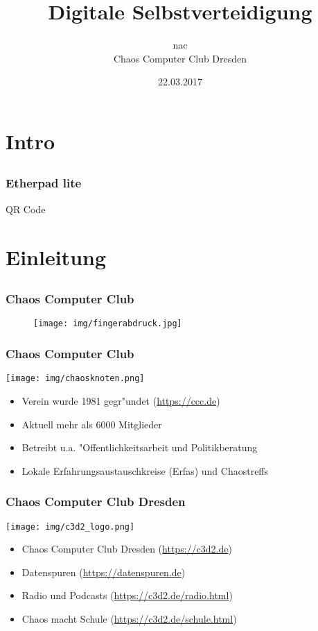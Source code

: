 \documentclass[12pt, table]{beamer}
\title{Digitale Selbstverteidigung}
\author{\small nac\\\large Chaos Computer Club Dresden}
\date{22.03.2017}
\begin{document}
\section{Intro}
\subsection{}

  \begin{frame}
    \frametitle{Etherpad lite}
    \begin{center}
      QR Code
    \end{center}
  \end{frame}

\section{Einleitung}
  \subsection{}

  \begin{frame}
    \frametitle{Chaos Computer Club}
    \begin{figure}
      \texttt{[image: img/fingerabdruck.jpg]}
    \end{figure}
  \end{frame}

  \begin{frame}
    \frametitle{Chaos Computer Club}
    \begin{center}
	    \texttt{[image: img/chaosknoten.png]}
    \end{center}	
    \begin{itemize}
      \item Verein wurde 1981 gegr"undet (\url{https://ccc.de})          
      \item Aktuell mehr als 6000 Mitglieder
      \item Betreibt u.a. "Offentlichkeitsarbeit und Politikberatung      
      \item Lokale Erfahrungsaustauschkreise (Erfas) und Chaostreffs
    \end{itemize}
  \end{frame}

  \begin{frame}
    \frametitle{Chaos Computer Club Dresden}
    \begin{center}
      \texttt{[image: img/c3d2\_logo.png]}
    \end{center}
    \begin{itemize}
      \item Chaos Computer Club Dresden (\url{https://c3d2.de})          
      \item Datenspuren (\url{https://datenspuren.de})
      \item Radio und Podcasts (\url{https://c3d2.de/radio.html})
      \item Chaos macht Schule (\url{https://c3d2.de/schule.html})
    \end{itemize}
  \end{frame}
  
\end{document}

